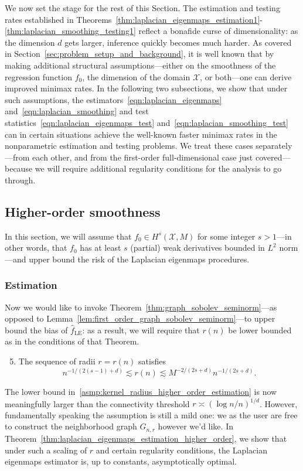 \documentclass{article}
\newcommand{\1}{\mathbf{1}}
\newcommand{\Xset}{\mathcal{X}}
\newcommand{\Leb}{L}
\newcommand{\wh}[1]{\widehat{#1}}
\newcommand{\LE}{\mathrm{LE}}
\theoremstyle{alden}
\theoremstyle{aldenthm}
\theoremstyle{definition}
\theoremstyle{remark}
\begin{document}
We now set the stage for the rest of this Section. The estimation and testing rates established in Theorems~\ref{thm:laplacian_eigenmaps_estimation1}-\ref{thm:laplacian_smoothing_testing1} reflect a bonafide curse of dimensionality: as the dimension $d$ gets larger, inference quickly becomes much harder. As covered in Section~\ref{sec:problem_setup_and_background}, it is well known that by making additional structural assumptions---either on the smoothness of the regression function $f_0$, the dimension of the domain $\Xset$, or both---one can derive improved minimax rates. In the following two subsections, we show that under such assumptions, the estimators~\eqref{eqn:laplacian_eigenmaps} and~\eqref{eqn:laplacian_smoothing} and test statistics~\eqref{eqn:laplacian_eigenmaps_test} and~\eqref{eqn:laplacian_smoothing_test} can in certain situations achieve the well-known faster minimax rates in the nonparametric estimation and testing problems. We treat these cases separately---from each other, and from the first-order full-dimensional case just covered---because we will require additional regularity conditions for the analysis to go through.

\subsection{Higher-order smoothness}
\label{subsec:minimax_higher_order_smoothness}

In this section, we will assume that $f_0 \in H^s(\Xset,M)$ for some integer $s > 1$---in other words, that $f_0$ has at least $s$ (partial) weak derivatives bounded in $\Leb^2$ norm---and upper bound the risk of the Laplacian eigenmaps procedures. 

\subsubsection{Estimation}
\label{subsec:minimax_estimation_higher_order}
Now we would like to invoke Theorem~\ref{thm:graph_sobolev_seminorm}---as opposed to Lemma~\ref{lem:first_order_graph_sobolev_seminorm}---to upper bound the bias of $\wh{f}_{\LE}$: as a result, we will require that $r(n)$ be lower bounded as in the conditions of that Theorem. 
\begin{enumerate}[label=(R\arabic*)]
	\setcounter{enumi}{4}
	\item 
	\label{asmp:kernel_radius_higher_order_estimation}
	The sequence of radii $r = r(n)$ satisfies
	\begin{equation*}
	n^{-1/(2(s - 1) + d)} \lesssim r(n) \lesssim M^{-2/(2s + d)}n^{-1/(2s + d)}.
	\end{equation*}
\end{enumerate}
The lower bound in~\ref{asmp:kernel_radius_higher_order_estimation} is now meaningfully larger than the connectivity threshold $r \asymp (\log n/n)^{1/d}$. However, fundamentally speaking the assumption is still a mild one: we as the user are free to construct the neighborhood graph $G_{n,r}$ however we'd like. In Theorem~\ref{thm:laplacian_eigenmaps_estimation_higher_order}, we show that under such a scaling of $r$ and certain regularity conditions, the Laplacian eigenmaps estimator is, up to constants, asymptotically optimal.
\end{document}
